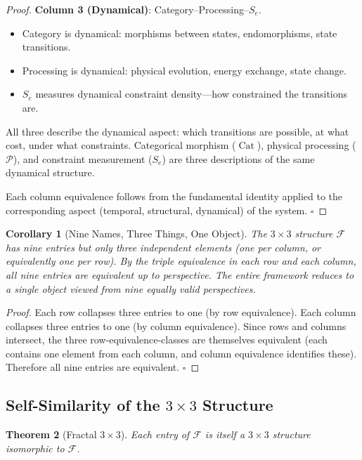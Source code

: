 \documentclass[12pt,twocolumn]{article}
\newtheorem{theorem}{Theorem}[section]
\newtheorem{corollary}[theorem]{Corollary}
\DeclareMathOperator{\Cat}{Cat}
\begin{document}
\begin{proof}
\textbf{Column 3 (Dynamical)}: Category--Processing--$S_e$.
\begin{itemize}
\item Category is dynamical: morphisms between states, endomorphisms, state transitions.
\item Processing is dynamical: physical evolution, energy exchange, state change.
\item $S_e$ measures dynamical constraint density---how constrained the transitions are.
\end{itemize}
All three describe the dynamical aspect: which transitions are possible, at what cost, under what constraints. Categorical morphism ($\Cat$), physical processing ($\mathcal{P}$), and constraint measurement ($S_e$) are three descriptions of the same dynamical structure.

Each column equivalence follows from the fundamental identity applied to the corresponding aspect (temporal, structural, dynamical) of the system. $\square$
\end{proof}

\begin{corollary}[Nine Names, Three Things, One Object]
\label{cor:nine_three_one}
The $3 \times 3$ structure $\mathcal{F}$ has nine entries but only three independent elements (one per column, or equivalently one per row). By the triple equivalence in each row and each column, all nine entries are equivalent up to perspective. The entire framework reduces to a single object viewed from nine equally valid perspectives.
\end{corollary}

\begin{proof}
Each row collapses three entries to one (by row equivalence). Each column collapses three entries to one (by column equivalence). Since rows and columns intersect, the three row-equivalence-classes are themselves equivalent (each contains one element from each column, and column equivalence identifies these). Therefore all nine entries are equivalent. $\square$
\end{proof}

\subsection{Self-Similarity of the $3 \times 3$ Structure}

\begin{theorem}[Fractal $3 \times 3$]
\label{thm:fractal_3x3}
Each entry of $\mathcal{F}$ is itself a $3 \times 3$ structure isomorphic to $\mathcal{F}$.
\end{theorem}
\end{document}
